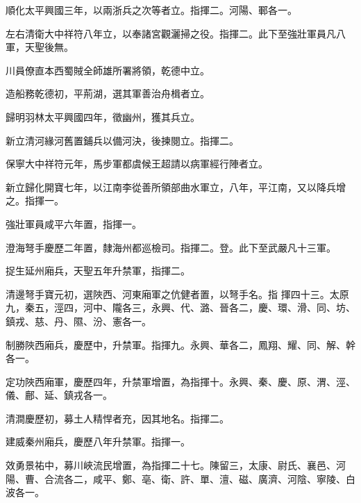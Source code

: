 \begin{pinyinscope}
 順化太平興國三年，以兩浙兵之次等者立。指揮二。河陽、鄆各一。



 左右清衛大中祥符八年立，以奉諸宮觀灑掃之役。指揮二。此下至強壯軍員凡八軍，天聖後無。



 川員僚直本西蜀賊全師雄所署將領，乾德中立。



 造船務乾德初，平荊湖，選其軍善治舟楫者立。



 歸明羽林太平興國四年，徵幽州，獲其兵立。



 新立清河緣河舊置鋪兵以備河決，後揀閱立。指揮二。



 保寧大中祥符元年，馬步軍都虞候王超請以病軍經行陣者立。



 新立歸化開寶七年，以江南李從善所領部曲水軍立，八年，平江南，又以降兵增之。指揮一。



 強壯軍員咸平六年置，指揮一。



 澄海弩手慶歷二年置，隸海州都巡檢司。指揮二。登。此下至武嚴凡十三軍。



 捉生延州廂兵，天聖五年升禁軍，指揮二。



 清邊弩手寶元初，選陜西、河東廂軍之伉健者置，以弩手名。指
 揮四十三。太原九，秦五，涇四，河中、隴各三，永興、代、潞、晉各二，慶、環、滑、同、坊、鎮戎、慈、丹、隰、汾、憲各一。



 制勝陜西廂兵，慶歷中，升禁軍。指揮九。永興、華各二，鳳翔、耀、同、解、幹各一。



 定功陜西廂軍，慶歷四年，升禁軍增置，為指揮十。永興、秦、慶、原、渭、涇、儀、鄜、延、鎮戎各一。



 清澗慶歷初，募土人精悍者充，因其地名。指揮二。



 建威秦州廂兵，慶歷八年升禁軍。指揮一。



 效勇景祐中，募川峽流民增置，為指揮二十七。陳留三，太康、尉氏、襄邑、河陽、曹、合流各二，咸平、鄭、亳、衛、許、單、澶、磁、廣濟、河陰、寧陵、白波各一。




\end{pinyinscope}
